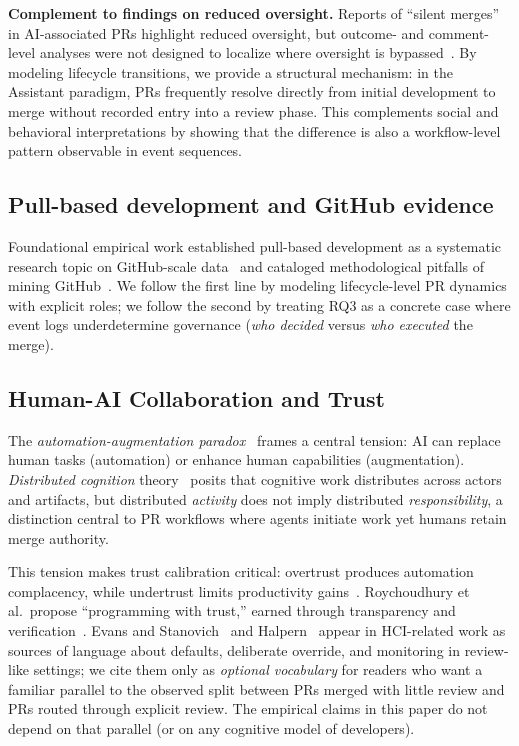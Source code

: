 \documentclass[sigconf]{acmart}
\begin{document}
\textbf{Complement to findings on reduced oversight.}
Reports of ``silent merges'' in AI-associated PRs highlight
reduced oversight, but outcome- and comment-level analyses
were not designed to localize where oversight is
bypassed~\cite{gao2026autopilot,rahman2026tasklevel}.
By modeling lifecycle transitions, we provide a structural
mechanism: in the Assistant paradigm, PRs frequently resolve
directly from initial development to merge without recorded entry
into a review phase.
This complements social and behavioral interpretations by showing
that the difference is also a workflow-level pattern observable in
event sequences.

\subsection{Pull-based development and GitHub evidence}

Foundational empirical work established pull-based development as a
systematic research topic on GitHub-scale data~\cite{gousios2014pull}
and cataloged methodological pitfalls of mining GitHub~\cite{kalliamvakou2014github}.
We follow the first line by modeling lifecycle-level PR dynamics with
explicit roles; we follow the second by treating RQ3 as a concrete case
where event logs underdetermine governance (\emph{who decided} versus
\emph{who executed} the merge).

\subsection{Human-AI Collaboration and Trust}

The \emph{automation-augmentation paradox}~\cite{raisch2021automation}
frames a central tension: AI can replace human tasks (automation)
or enhance human capabilities (augmentation).
\emph{Distributed cognition} theory~\cite{hollan2000distributed}
posits that cognitive work distributes across actors and artifacts,
but distributed \emph{activity} does not imply distributed
\emph{responsibility}, a distinction central to PR workflows
where agents initiate work yet humans retain merge authority.

This tension makes trust calibration critical: overtrust produces
automation complacency, while undertrust limits productivity
gains~\cite{okamura2020trust,glikson2020trust}.
Roychoudhury et al.\ propose ``programming with trust,'' earned
through transparency and verification~\cite{roychoudhury2025trust}.
Evans and Stanovich~\cite{evans2013dualprocess} and Halpern~\cite{halpern2014thought}
appear in HCI-related work as sources of language about defaults,
deliberate override, and monitoring in review-like settings; we cite
them only as \emph{optional vocabulary} for readers who want a
familiar parallel to the observed split between PRs merged with
little review and PRs routed through explicit review.
The empirical claims in this paper do not depend on that parallel
(or on any cognitive model of developers).
\end{document}
